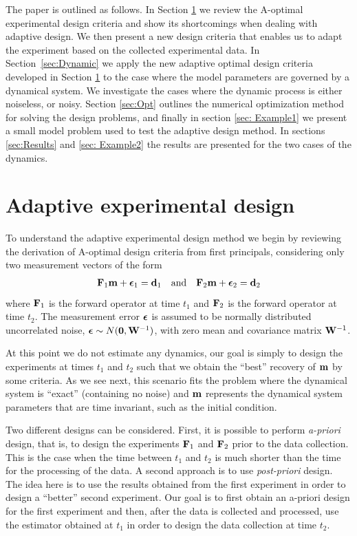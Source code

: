 \documentclass[11pt]{article}
\begin{document}
\bigskip


The paper is outlined as follows. In Section \ref{sec: Adaptive} we review the A-optimal experimental design
criteria and show its shortcomings when dealing with adaptive design.  We then present a new
design criteria that enables us to adapt the experiment based on the collected experimental data.
In Section~\ref{sec:Dynamic} we apply the new adaptive optimal design criteria developed in Section \ref{sec: Adaptive}
to the case where the model parameters are governed by a dynamical system. We investigate the cases where the dynamic process is either noiseless, or noisy. 
Section \ref{sec:Opt}  outlines the numerical optimization method for solving the design problems, and finally in section \ref{sec: Example1} we present a small model problem used to test the adaptive design method. In sections \ref{sec:Results} and \ref{sec: Example2} the results are presented for the two cases of the dynamics. 




\section{ Adaptive experimental design }
\label{sec: Adaptive}
To understand the adaptive experimental design method we  begin by reviewing the derivation of A-optimal
 design criteria from first principals, considering only two measurement vectors  of the form
\begin{align}
\label{data}
{\bf{F}}_{1} {\bf{m}} + {\boldsymbol \epsilon}_1 = {\bf{d}}_{1}\quad {\rm and} \quad {\bf{F}}_{2} {\bf{m}} + {\boldsymbol \epsilon}_2 = {\bf{d}}_{2}
\end{align}
where ${\bf{F}}_{1}$ is the forward operator at time $t_{1}$ and ${\bf{F}}_{2}$ is the forward operator 
at time $t_{2}$. The measurement error ${\boldsymbol \epsilon}$ is assumed to be normally distributed uncorrelated noise, $ {\boldsymbol \epsilon}\sim N({\bf 0},{\bf{W}}^{-1})$, with zero mean and covariance matrix ${\bf{W}}^{-1}$. 

At this point we do not estimate any dynamics,
our goal is simply to design the experiments at times $t_{1}$ and $t_{2}$ such that we obtain the ``best''
recovery of ${\bf{m}}$ by some criteria.
As we see next, this scenario fits the problem where the dynamical system is ``exact'' (containing
no noise) and ${\bf{m}}$ represents the dynamical system parameters that are time invariant, such as the initial condition.

Two different designs can be considered. First, it is possible to perform {\em a-priori} design, that is,
to design the experiments ${\bf{F}}_{1}$ and ${\bf{F}}_{2}$ prior to the data collection. This is the case
when the time between $t_{1}$ and $t_{2}$ is much shorter than the time for the processing
of the data. A second approach is to use {\em post-priori} design. The idea here is to use the 
results obtained from the first experiment in order to design a ``better'' second experiment.
Our goal is to first obtain an a-priori design for the first experiment
and then, after the data is collected and processed, use the estimator
obtained at $t_{1}$ in order  to design the data collection
at time $t_{2}$.
\end{document}
